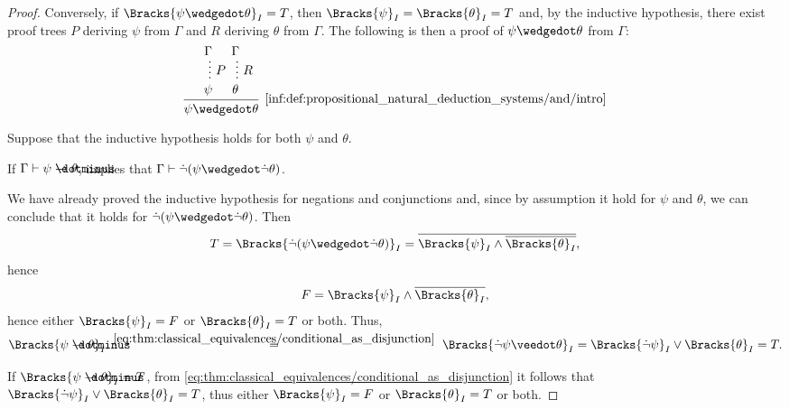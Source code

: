 \begin{proof}
  \NecessitySubProof* Conversely, if \( \Bracks{\psi \synwedge \theta}_I = T \), then \( \Bracks{\psi}_I = \Bracks{\theta}_I = T \) and, by the inductive hypothesis, there exist proof trees \( P \) deriving \( \psi \) from \( \Gamma \) and \( R \) deriving \( \theta \) from \( \Gamma \). The following is then a proof of \( \psi \synwedge \theta \) from \( \Gamma \):
  \begin{equation*}
    \begin{prooftree}
      \hypo{ \Gamma }
      \ellipsis {\( P \)} { \psi }

      \hypo{ \Gamma }
      \ellipsis {\( R \)} { \theta }

      \infer2[\ref{inf:def:propositional_natural_deduction_systems/and/intro}]{ \psi \synwedge \theta }
    \end{prooftree}
  \end{equation*}

   Suppose that the inductive hypothesis holds for both \( \psi \) and \( \theta \).

  \SufficiencySubProof* If \( \Gamma \vdash \psi \synimplies \theta \),  implies that \( \Gamma \vdash \synneg(\psi \synwedge \synneg \theta) \).

  We have already proved the inductive hypothesis for negations and conjunctions and, since by assumption it hold for \( \psi \) and \( \theta \), we can conclude that it holds for \( \synneg(\psi \synwedge \synneg \theta) \). Then
  \begin{equation*}
    T
    =
    \Bracks{\synneg(\psi \synwedge \synneg \theta)}_I
    =
    \oline{\Bracks{\psi}_I \wedge \oline{\Bracks{\theta}_I}},
  \end{equation*}
  hence
  \begin{equation*}
    F = \Bracks{\psi}_I \wedge \oline{\Bracks{\theta}_I},
  \end{equation*}
  hence either \( \Bracks{\psi}_I = F \) or \( \Bracks{\theta}_I = T \) or both. Thus,
  \begin{equation*}
    \Bracks{\psi \synimplies \theta}_I
    \reloset {\eqref{eq:thm:classical_equivalences/conditional_as_disjunction}} =
    \Bracks{\synneg \psi \synvee \theta}_I
    =
    \Bracks{\synneg \psi}_I \vee \Bracks{\theta}_I
    =
    T.
  \end{equation*}

  \NecessitySubProof* If \( \Bracks{\psi \synimplies \theta}_I = T \), from \eqref{eq:thm:classical_equivalences/conditional_as_disjunction} it follows that \( \Bracks{\synneg \psi}_I \vee \Bracks{\theta}_I = T \), thus either \( \Bracks{\psi}_I = F \) or \( \Bracks{\theta}_I = T \) or both.


\end{proof}
